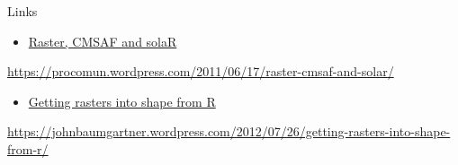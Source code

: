 \documentclass[ignorenonframetext,]{beamer}
\providecommand{\tightlist}{%
  \setlength{\itemsep}{0pt}\setlength{\parskip}{0pt}}
\begin{document}
\begin{frame}{Links}

\begin{itemize}
\tightlist
\item
  \href{https://procomun.wordpress.com/2011/06/17/raster-cmsaf-and-solar/}{Raster,
  CMSAF and solaR}
\end{itemize}

\url{https://procomun.wordpress.com/2011/06/17/raster-cmsaf-and-solar/}

\begin{itemize}
\tightlist
\item
  \href{https://johnbaumgartner.wordpress.com/2012/07/26/getting-rasters-into-shape-from-r/}{Getting
  rasters into shape from R}
\end{itemize}

\url{https://johnbaumgartner.wordpress.com/2012/07/26/getting-rasters-into-shape-from-r/}

\end{frame}
\end{document}

